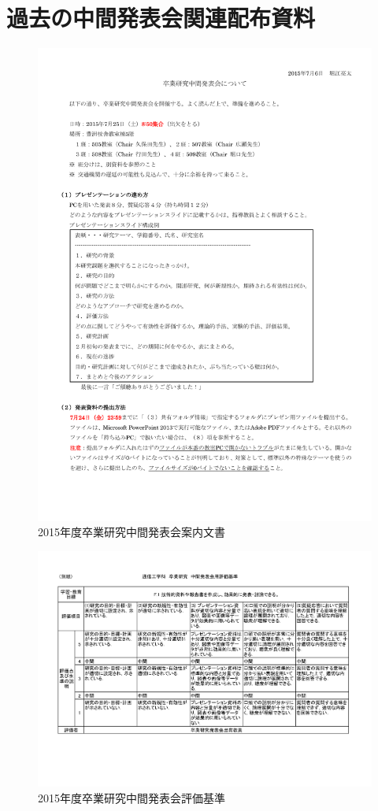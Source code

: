 \documentclass[a4j,12pt,dvipdfmx,oneside]{jsbook}
\theoremstyle{definition}
\begin{document}
\chapter{過去の中間発表会関連配布資料}\label{chap:chukan}
%
%
%
\begin{figure}[htbp]
\includegraphics[width=0.65\linewidth]{chukanAnnounce.pdf}
\caption{2015年度卒業研究中間発表会案内文書}
\label{fig:chukanAnnounce}
\end{figure}
\begin{figure}[htbp]
\includegraphics[width=\linewidth]{chukanLevel.pdf}
\caption{2015年度卒業研究中間発表会評価基準}
\label{fig:chukanLevel}
\end{figure}
%
%
%
\end{document}

